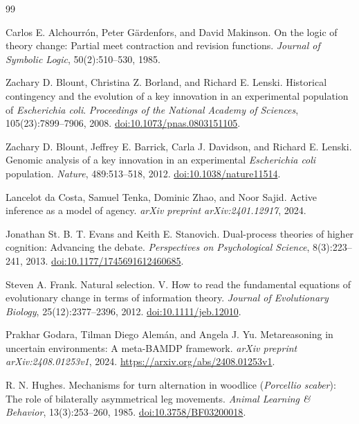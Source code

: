 \documentclass[11pt,a4paper]{article}
\theoremstyle{remark}
\begin{document}
\begin{thebibliography}{99}

Carlos E. Alchourr\'on, Peter G\"ardenfors, and David Makinson.
On the logic of theory change: Partial meet contraction and revision functions.
\emph{Journal of Symbolic Logic}, 50(2):510--530, 1985.

Zachary D. Blount, Christina Z. Borland, and Richard E. Lenski.
Historical contingency and the evolution of a key innovation in an
experimental population of \emph{Escherichia coli}.
\emph{Proceedings of the National Academy of Sciences}, 105(23):7899--7906, 2008.
\href{https://doi.org/10.1073/pnas.0803151105}{doi:10.1073/pnas.0803151105}.

Zachary D. Blount, Jeffrey E. Barrick, Carla J. Davidson, and Richard E. Lenski.
Genomic analysis of a key innovation in an experimental \emph{Escherichia coli}
population.
\emph{Nature}, 489:513--518, 2012.
\href{https://doi.org/10.1038/nature11514}{doi:10.1038/nature11514}.

Lancelot da Costa, Samuel Tenka, Dominic Zhao, and Noor Sajid.
Active inference as a model of agency.
\emph{arXiv preprint arXiv:2401.12917}, 2024.

Jonathan St. B. T. Evans and Keith E. Stanovich.
Dual-process theories of higher cognition: Advancing the debate.
\emph{Perspectives on Psychological Science}, 8(3):223--241, 2013.
\href{https://doi.org/10.1177/1745691612460685}{doi:10.1177/1745691612460685}.

Steven A. Frank.
Natural selection. V. How to read the fundamental equations of evolutionary
change in terms of information theory.
\emph{Journal of Evolutionary Biology}, 25(12):2377--2396, 2012.
\href{https://doi.org/10.1111/jeb.12010}{doi:10.1111/jeb.12010}.

Prakhar Godara, Tilman Diego Alem\'an, and Angela J. Yu.
Metareasoning in uncertain environments: A meta-BAMDP framework.
\emph{arXiv preprint arXiv:2408.01253v1}, 2024.
\url{https://arxiv.org/abs/2408.01253v1}.

R. N. Hughes.
Mechanisms for turn alternation in woodlice (\emph{Porcellio scaber}):
The role of bilaterally asymmetrical leg movements.
\emph{Animal Learning \& Behavior}, 13(3):253--260, 1985.
\href{https://doi.org/10.3758/BF03200018}{doi:10.3758/BF03200018}.


\end{thebibliography}
\end{document}
